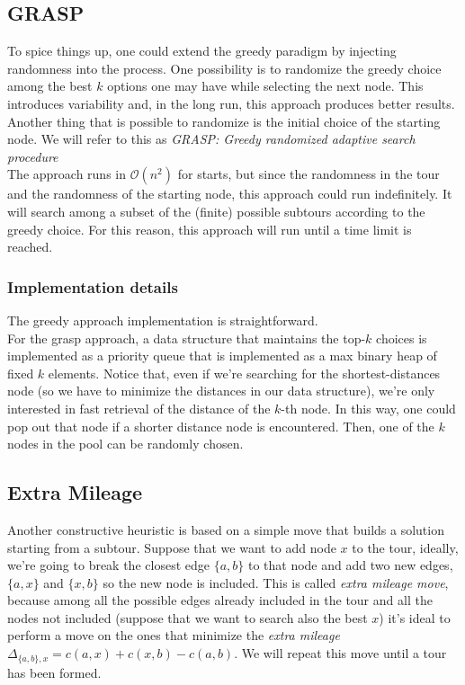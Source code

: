 \subsection{GRASP}
To spice things up, one could extend the greedy paradigm by injecting randomness
into the process. One possibility is to randomize the greedy choice among the best
$k$ options one may have while selecting the next node. This introduces
variability and, in the long run, this approach produces better results. Another
thing that is possible to randomize is the initial choice of the starting
node. We will refer to this as \emph{GRASP: Greedy randomized adaptive search procedure}\\
The approach runs in $\mathcal{O}(n^2)$ for starts, but since the randomness in
the tour and the randomness of the starting node, this approach could run
indefinitely. It will search among a subset of the (finite) possible subtours
according to the greedy choice. For this reason, this approach will run until a
time limit is reached.

\subsubsection{Implementation details}
The greedy approach implementation is straightforward.\\ 
For the grasp approach, a data structure that maintains the top-$k$ choices is
implemented as a priority queue that is implemented as a max binary heap of
fixed $k$ elements. Notice that, even if we're searching for the
shortest-distances node (so we have to minimize the distances in our data
structure), we're only interested in fast retrieval of the distance of the
$k$-th node. In this way, one could pop out that node if a shorter distance
node is encountered. Then, one of the $k$ nodes in the pool can be randomly
chosen.

\subsection{Extra Mileage}
Another constructive heuristic is based on a simple move that builds a solution
starting from a subtour. Suppose that we want to add node $x$ to the tour,
ideally, we're going to break the closest edge $\{a, b\}$ to that node and add
two new edges, $\{a, x\}$ and $\{x, b\}$ so the new node is included. This is
called \emph{extra mileage move}, because among all the possible edges already
included in the tour and all the nodes not included (suppose that we want to
search also the best $x$) it's ideal to perform a move on the ones that
minimize the \emph{extra mileage} $\Delta_{\{a,b\},x} = c(a,x) + c(x, b) - c(a,
b)$. We will repeat this move until a tour has been formed.

